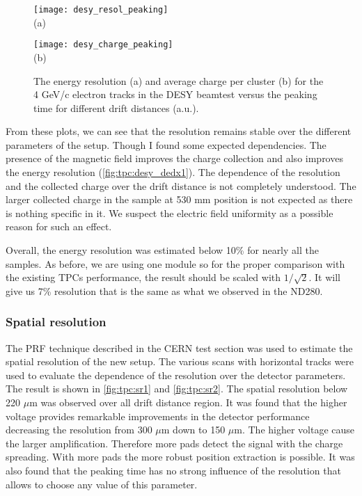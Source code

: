 \documentclass[../main.tex]{subfiles}
\begin{document}
\begin{figure}[!ht]
  \centering
  \begin{minipage}{0.49\linewidth}
    \centering
    \texttt{[image: desy\_resol\_peaking]} \\ (a)
  \end{minipage}
  \begin{minipage}{0.49\linewidth}
    \centering
    \texttt{[image: desy\_charge\_peaking]} \\ (b)
  \end{minipage}
  \caption{The energy resolution (a) and average charge per cluster (b) for the 4 GeV/c electron tracks in the DESY beamtest versus the peaking time for different drift distances (a.u.).}
  \label{fig:tpc:desy_dedx4}
\end{figure}

From these plots, we can see that the resolution remains stable over the different parameters of the setup. Though I found some expected dependencies. The presence of the magnetic field improves the charge collection and also improves the energy resolution (\autoref{fig:tpc:desy_dedx1}). The dependence of the resolution and the collected charge over the drift distance is not completely understood. The larger collected charge in the sample at 530 mm position is not expected as there is nothing specific in it. We suspect the electric field uniformity as a possible reason for such an effect.

Overall, the energy resolution was estimated below 10\% for nearly all the samples. As before, we are using one module so for the proper comparison with the existing TPCs performance, the result should be scaled with $1/\sqrt{2}$. It will give us 7\% resolution that is the same as what we observed in the ND280.

\subsubsection{Spatial resolution}
The PRF technique described in the CERN test section was used to estimate the spatial resolution of the new setup. The various scans with horizontal tracks were used to evaluate the dependence of the resolution over the detector parameters. The result is shown in \autoref{fig:tpc:sr1} and \autoref{fig:tpc:sr2}. The spatial resolution below 220 $\mu$m was observed over all drift distance region. It was found that the higher voltage provides remarkable improvements in the detector performance decreasing the resolution from 300 $\mu$m down to 150 $\mu$m. The higher voltage cause the larger amplification. Therefore more pads detect the signal with the charge spreading. With more pads the more robust position extraction is possible. It was also found that the peaking time has no strong influence of the resolution that allows to choose any value of this parameter.
\end{document}
